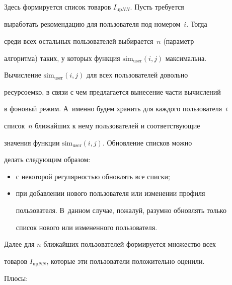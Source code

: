 Здесь формируется список товаров $I_{\mathrm{up}NN}.$ Пусть требуется


выработать рекомендацию для пользователя под номером~$i.$ Тогда


среди всех остальных пользователей выбирается~$n$ (параметр


алгоритма) таких, у которых функция $\mathrm{sim}_{\mathrm{user}}(i,j)$ максимальна.


Вычисление $\mathrm{sim}_{\mathrm{user}}(i,j)$ для всех пользователей довольно


ресурсоемко, в связи с чем предлагается вынесение части вычислений


в фоновый режим. А~именно будем хранить для каждого пользователя~$i$ 


список~$n$ ближайших к нему пользователей и соответствующие


значения функции $\mathrm{sim}_{\mathrm{user}}(i,j).$ Обновление списков можно


делать следующим образом:


\begin{itemize} %


    \item с некоторой регулярностью обновлять все списки;


\item при добавлении нового пользователя или изменении профиля


пользователя. В~данном случае, пожалуй, разумно обновлять только


список нового или измененного пользователя.


\end{itemize}


Далее для $n$ ближайших пользователей формируется множество всех


товаров $I_{\mathrm{up}NN}$, которые эти пользователи положительно оценили.





Плюсы:


